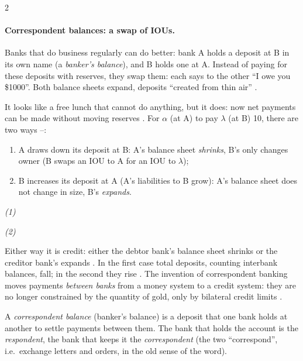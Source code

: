 \begin{paracol}{2}
\paragraph{Correspondent balances: a swap of IOUs.} Banks that do business regularly can do better: bank A holds a deposit at B in its own
name (a \emph{banker's balance}), and B holds one at A. Instead of paying for these deposits with reserves, they swap them: each says to the
other ``I owe you \$1000''. Both balance sheets expand, deposits ``created from thin air'' .
\begin{taccts}
\qquad
{}
\end{taccts}
It looks like a free lunch that cannot do anything, but it does: now net payments can be made without moving reserves
. For $\alpha$ (at A) to pay $\lambda$ (at B) 10, there are two ways --:
\begin{enumerate}
  \item A draws down its deposit at B: A's balance sheet \emph{shrinks}, B's only changes owner (B swaps an IOU to A for an IOU to $\lambda$);
  \item B increases its deposit at A (A's liabilities to B grow): A's balance sheet does not change in size, B's \emph{expands}.
\end{enumerate}
\begin{taccts}
\textit{(1)}\quad{}\quad
{}

\medskip
\textit{(2)}\quad{}\quad
{}
\end{taccts}
Either way it is credit: either the debtor bank's balance sheet shrinks or the creditor bank's expands . In the first case total
deposits, counting interbank balances, fall; in the second they rise . The invention of correspondent banking moves payments \emph{between
banks} from a money system to a credit system: they are no longer constrained by the quantity of gold, only by bilateral credit limits .

\begin{definition}
A \emph{correspondent balance} (banker's balance) is a deposit that one bank holds at another to settle payments between them. The bank that
holds the account is the \emph{respondent}, the bank that keeps it the \emph{correspondent} (the two ``correspond'', i.e.\ exchange letters and
orders, in the old sense of the word).
\end{definition}


\end{paracol}
